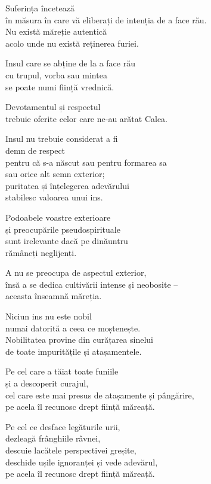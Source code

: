 Suferința încetează\\
în măsura în care vă eliberați de intenția de a face rău.\\
Nu există măreție autentică\\
acolo unde nu există reținerea furiei.


Insul care se abține de la a face rău\\
cu trupul, vorba sau mintea\\
se poate numi ființă vrednică.


Devotamentul și respectul\\
trebuie oferite celor care ne-au arătat Calea.


Insul nu trebuie considerat a fi\\
demn de respect\\
pentru că s-a născut sau pentru formarea sa\\
sau orice alt semn exterior;\\
puritatea și înțelegerea adevărului\\
stabilesc valoarea unui ins.


Podoabele voastre exterioare\\
și preocupările pseudospirituale\\
sunt irelevante dacă pe dinăuntru\\
rămâneți neglijenți.


A nu se preocupa de aspectul exterior,\\
însă a se dedica cultivării intense și neobosite –\\
aceasta înseamnă măreția.

Niciun ins nu este nobil\\
numai datorită a ceea ce moștenește.\\
Nobilitatea provine din curățarea sinelui\\
de toate impuritățile și atașamentele.

Pe cel care a tăiat toate funiile\\
și a descoperit curajul,\\
cel care este mai presus de atașamente și pângărire,\\
pe acela îl recunosc drept ființă măreață.


Pe cel ce desface legăturile urii,\\
dezleagă frânghiile râvnei,\\
descuie lacătele perspectivei greșite,\\
deschide ușile ignoranței și vede adevărul,\\
pe acela îl recunosc drept ființă măreață.



